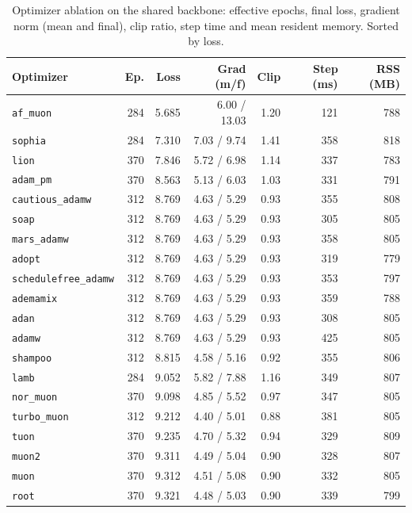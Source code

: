 \begin{table}[H]
\centering
\small
\caption{Optimizer ablation on the shared backbone: effective epochs, final loss, gradient norm (mean and final), clip ratio, step time and mean resident memory. Sorted by loss.}
\label{tab:r3-optimizers}
\begin{tabular}{lrrrrrr}
\toprule
Optimizer & Ep. & Loss & Grad (m/f) & Clip & Step (ms) & RSS (MB) \\
\midrule
\texttt{af\_muon} & 284 & 5.685 & 6.00 / 13.03 & 1.20 & 121 & 788 \\
\texttt{sophia} & 284 & 7.310 & 7.03 / 9.74 & 1.41 & 358 & 818 \\
\texttt{lion} & 370 & 7.846 & 5.72 / 6.98 & 1.14 & 337 & 783 \\
\texttt{adam\_pm} & 370 & 8.563 & 5.13 / 6.03 & 1.03 & 331 & 791 \\
\texttt{cautious\_adamw} & 312 & 8.769 & 4.63 / 5.29 & 0.93 & 355 & 808 \\
\texttt{soap} & 312 & 8.769 & 4.63 / 5.29 & 0.93 & 305 & 805 \\
\texttt{mars\_adamw} & 312 & 8.769 & 4.63 / 5.29 & 0.93 & 358 & 805 \\
\texttt{adopt} & 312 & 8.769 & 4.63 / 5.29 & 0.93 & 319 & 779 \\
\texttt{schedulefree\_adamw} & 312 & 8.769 & 4.63 / 5.29 & 0.93 & 353 & 797 \\
\texttt{ademamix} & 312 & 8.769 & 4.63 / 5.29 & 0.93 & 359 & 788 \\
\texttt{adan} & 312 & 8.769 & 4.63 / 5.29 & 0.93 & 308 & 805 \\
\texttt{adamw} & 312 & 8.769 & 4.63 / 5.29 & 0.93 & 425 & 805 \\
\texttt{shampoo} & 312 & 8.815 & 4.58 / 5.16 & 0.92 & 355 & 806 \\
\texttt{lamb} & 284 & 9.052 & 5.82 / 7.88 & 1.16 & 349 & 807 \\
\texttt{nor\_muon} & 370 & 9.098 & 4.85 / 5.52 & 0.97 & 347 & 805 \\
\texttt{turbo\_muon} & 312 & 9.212 & 4.40 / 5.01 & 0.88 & 381 & 805 \\
\texttt{tuon} & 370 & 9.235 & 4.70 / 5.32 & 0.94 & 329 & 809 \\
\texttt{muon2} & 370 & 9.311 & 4.49 / 5.04 & 0.90 & 328 & 807 \\
\texttt{muon} & 370 & 9.312 & 4.51 / 5.08 & 0.90 & 332 & 805 \\
\texttt{root} & 370 & 9.321 & 4.48 / 5.03 & 0.90 & 339 & 799 \\

\end{tabular}
\end{table}
